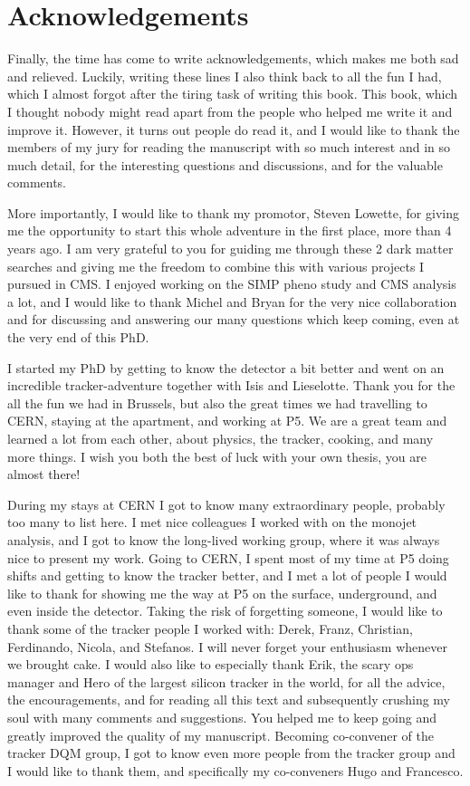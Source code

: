 
\chapter*{Acknowledgements}

Finally, the time has come to write acknowledgements, which makes me both sad and relieved. Luckily, writing these lines I also think back to all the fun I had, which I almost forgot after the tiring task of writing this book. This book, which I thought nobody might read apart from the people who helped me write it and improve it. However, it turns out people do read it, and I would like to thank the members of my jury for reading the manuscript with so much interest and in so much detail, for the interesting questions and discussions, and for the valuable comments.

More importantly, I would like to thank my promotor, Steven Lowette, for giving me the opportunity to start this whole adventure in the first place, more than 4 years ago. I am very grateful to you for guiding me through these 2 dark matter searches and giving me the freedom to combine this with various projects I pursued in CMS. I enjoyed working on the SIMP pheno study and CMS analysis a lot, and I would like to thank Michel and Bryan for the very nice collaboration and for discussing and answering our many questions which keep coming, even at the very end of this PhD.

I started my PhD by getting to know the detector a bit better and went on an incredible tracker-adventure together with Isis and Lieselotte. Thank you for the all the fun we had in Brussels, but also the great times we had travelling to CERN, staying at the apartment, and working at P5. We are a great team and learned a lot from each other, about physics, the tracker, cooking, and many more things. I wish you both the best of luck with your own thesis, you are almost there!

During my stays at CERN I got to know many extraordinary people, probably too many to list here. I met nice colleagues I worked with on the monojet analysis, and I got to know the long-lived working group, where it was always nice to present my work. Going to CERN, I spent most of my time at P5 doing shifts and getting to know the tracker better, and I met a lot of people I would like to thank for showing me the way at P5 on the surface, underground, and even inside the detector. Taking the risk of forgetting someone, I would like to thank some of the tracker people I worked with: Derek, Franz, Christian, Ferdinando, Nicola, and Stefanos. I will never forget your enthusiasm whenever we brought cake. I would also like to especially thank Erik, the scary ops manager and Hero of the largest silicon tracker in the world, for all the advice, the encouragements, and for reading all this text and subsequently crushing my soul with many comments and suggestions. You helped me to keep going and greatly improved the quality of my manuscript. Becoming co-convener of the tracker DQM group, I got to know even more people from the tracker group and I would like to thank them, and specifically my co-conveners Hugo and Francesco.


